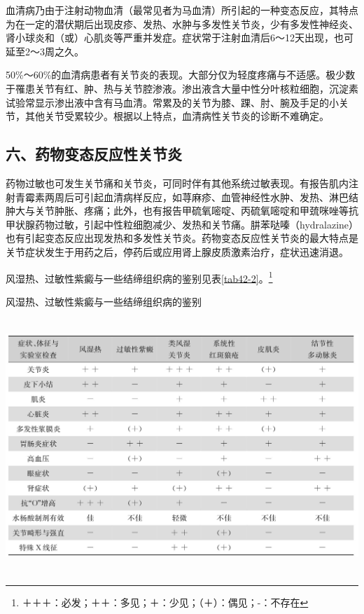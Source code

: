 血清病乃由于注射动物血清（最常见者为马血清）所引起的一种变态反应，其特点为在一定的潜伏期后出现皮疹、发热、水肿与多发性关节炎，少有多发性神经炎、肾小球炎和（或）心肌炎等严重并发症。症状常于注射血清后6～12天出现，也可延至2～3周之久。

50\%～60\%的血清病患者有关节炎的表现。大部分仅为轻度疼痛与不适感。极少数于罹患关节有红、肿、热与关节腔渗液。渗出液含大量中性分叶核粒细胞，沉淀素试验常显示渗出液中含有马血清。常累及的关节为膝、踝、肘、腕及手足的小关节，其他关节受累较少。根据以上特点，血清病性关节炎的诊断不难确定。

\subsection{六、药物变态反应性关节炎}

药物过敏也可发生关节痛和关节炎，可同时伴有其他系统过敏表现。有报告肌内注射青霉素两周后可引起血清病样反应，如荨麻疹、血管神经性水肿、发热、淋巴结肿大与关节肿胀、疼痛；此外，也有报告甲硫氧嘧啶、丙硫氧嘧啶和甲巯咪唑等抗甲状腺药物过敏，引起中性粒细胞减少、发热和关节痛。肼苯哒嗪（hydralazine）也有引起变态反应出现发热和多发性关节炎。药物变态反应性关节炎的最大特点是关节症状发生于用药之后，停药后或应用肾上腺皮质激素治疗，症状迅速消退。

风湿热、过敏性紫癜与一些结缔组织病的鉴别见表\ref{tab42-2}。\footnote{＋＋＋：必发；＋＋：多见；＋：少见；（＋）：偶见；-：不存在}

\begin{table}[htbp]
\centering
\caption{风湿热、过敏性紫癜与一些结缔组织病的鉴别}
\label{tab42-2}
\includegraphics[width=5.94792in,height=3.77083in]{./images/Image00255.jpg}
\end{table}

